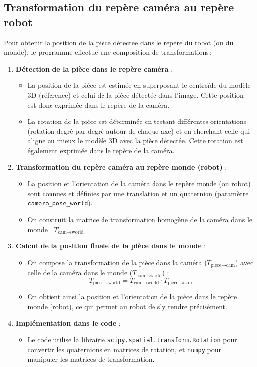 \subsection{Transformation du repère caméra au repère robot}

Pour obtenir la position de la pièce détectée dans le repère du robot (ou du monde), le programme effectue une composition de transformations :

\begin{enumerate}
    \item \textbf{Détection de la pièce dans le repère caméra} :
          \begin{itemize}
              \item La position de la pièce est estimée en superposant le centroïde du modèle 3D (référence) et celui de la pièce détectée dans l'image. Cette position est donc exprimée dans le repère de la caméra.
              \item La rotation de la pièce est déterminée en testant différentes orientations (rotation degré par degré autour de chaque axe) et en cherchant celle qui aligne au mieux le modèle 3D avec la pièce détectée. Cette rotation est également exprimée dans le repère de la caméra.
          \end{itemize}
    \item \textbf{Transformation du repère caméra au repère monde (robot)} :
          \begin{itemize}
              \item La position et l'orientation de la caméra dans le repère monde (ou robot) sont connues et définies par une translation et un quaternion (paramètre \texttt{camera\_pose\_world}).
              \item On construit la matrice de transformation homogène de la caméra dans le monde : $T_{\text{cam} \to \text{world}}$.
          \end{itemize}
    \item \textbf{Calcul de la position finale de la pièce dans le monde} :
          \begin{itemize}
              \item On compose la transformation de la pièce dans la caméra ($T_{\text{piece} \to \text{cam}}$) avec celle de la caméra dans le monde ($T_{\text{cam} \to \text{world}}$) :
                    \[
                        T_{\text{piece} \to \text{world}} = T_{\text{cam} \to \text{world}} \cdot T_{\text{piece} \to \text{cam}}
                    \]
              \item On obtient ainsi la position et l'orientation de la pièce dans le repère monde (robot), ce qui permet au robot de s'y rendre précisément.
          \end{itemize}
    \item \textbf{Implémentation dans le code} :
          \begin{itemize}
              \item Le code utilise la librairie \texttt{scipy.spatial.transform.Rotation} pour convertir les quaternions en matrices de rotation, et \texttt{numpy} pour manipuler les matrices de transformation.
          \end{itemize}
\end{enumerate}

